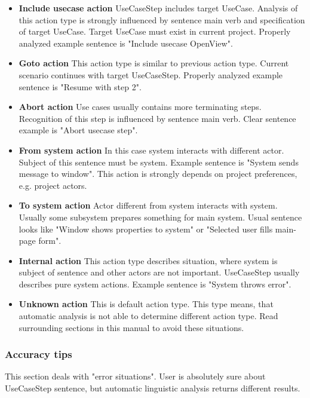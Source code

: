 \begin{itemize}
\item {\bf Include usecase action} UseCaseStep includes target UseCase. Analysis of this action type is strongly influenced by sentence main verb and specification of target UseCase. Target UseCase must exist in current project. Properly analyzed example sentence is "Include usecase OpenView". 
 
\item {\bf Goto action} This action type is similar to previous action type. Current scenario continues with target UseCaseStep. Properly analyzed example sentence is "Resume with step 2". 

\item {\bf Abort action} Use cases usually contains more terminating steps. Recognition of this step is influenced by sentence main verb. Clear sentence example is "Abort usecase step".

\item {\bf From system action} In this case system interacts with different actor. Subject of this sentence must be system. Example sentence is "System sends message to window". This action is strongly depends on project preferences, e.g. project actors.

\item {\bf To system action} Actor different from system interacts with system. Usually some subsystem prepares something for main system. Usual sentence looks like "Window shows properties to system" or "Selected user fills main-page form".

\item {\bf Internal action} This action type describes situation, where system is subject of sentence and other actors are not important. UseCaseStep usually describes pure system actions. Example sentence is "System throws error".

\item {\bf Unknown action} This is default action type. This type means, that automatic analysis is not able to determine different action type. Read surrounding sections in this manual to avoid these situations.
\end{itemize}

\subsubsection{Accuracy tips}
This section deals with "error situations". User is absolutely sure about UseCaseStep sentence, but automatic linguistic analysis returns different results.

